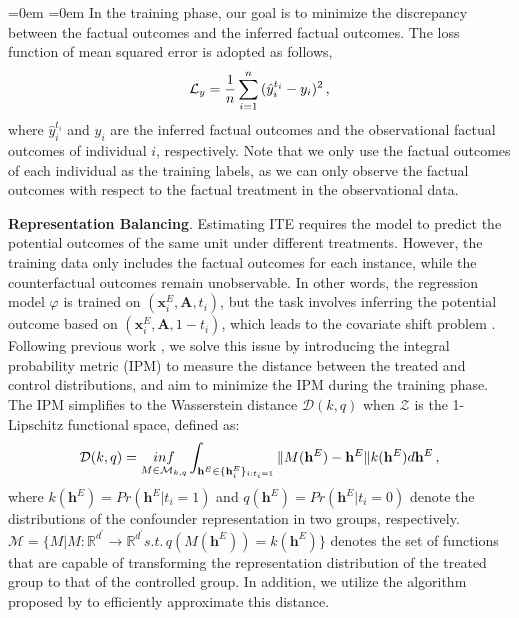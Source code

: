 \documentclass[twoside,leqno,twocolumn]{article}
\begin{document}
\begin{list}{}{\leftmargin=0em \itemindent=0em \topsep=0pt \parsep=0pt \itemsep=2pt}
In the training phase, our goal is to minimize the discrepancy between the factual outcomes and the inferred factual outcomes. The loss function of mean squared error is adopted as follows,
\begin{equation}
\label{eq14}
    \mathcal{L}_y = \frac{1}{n} \sum _{i=1}^{n} {(\hat{y}_i^{t_i} - y_i)^2} \,,
    \vspace{-0.5em}
\end{equation}
where $\hat{y}_i^{t_i}$ and ${y}_i$ are the inferred factual outcomes and the observational factual outcomes of individual $i$, respectively. 
Note that we only use the factual outcomes of each individual as the training labels, as we can only observe the factual outcomes with respect to the factual treatment in the observational data. 
\vspace{-0.2em}
\item \textbf{Representation Balancing}. Estimating ITE requires the model to predict the potential outcomes of the same unit under different treatments. However, the training data only includes the factual outcomes for each instance, while the counterfactual outcomes remain unobservable. 
In other words, the regression model $\varphi$ is trained on $(\mathbf{x}_i^E, \mathbf{A}, t_i)$, but the task involves inferring the potential outcome based on $(\mathbf{x}_i^E, \mathbf{A}, 1-t_i)$, which leads to the covariate shift problem \cite{johansson2016learning}. 
Following previous work \cite{shalit2017estimating}, we solve this issue by introducing the integral probability metric (IPM) to measure the distance between the treated and control distributions, and aim to minimize the IPM during the training phase. The IPM simplifies to the Wasserstein distance $\mathcal{D}(k,q)$ when $\mathcal{Z}$ is the 1-Lipschitz functional space, defined as:
\begin{equation}
\vspace{-0.2em}
\label{eq15}
\mathcal{D}(k,q)= \mathop{inf}\limits_{M \in \mathcal{M}_{k,q}}  \int_{
\mathbf{h}^E \in \{ \mathbf{h}^E_i \}_{i:t_i=1}
} \Vert M(\mathbf{h}^E)-\mathbf{h}^E \Vert k(\mathbf{h}^E)d\mathbf{h}^E \,,
\end{equation}
where $k(\mathbf{h}^E)=Pr(\mathbf{h}^E|t_i=1)$ and $q(\mathbf{h}^E)=Pr(\mathbf{h}^E|t_i=0)$ denote the distributions of the confounder representation in two groups, respectively.  
$\mathcal{M}=\{
M|M:\mathbb{R}^{d^\prime} \rightarrow \mathbb{R}^{d^\prime}   
s.t. \, q(M(\mathbf{h}^E)) = k(\mathbf{h}^E)
\}$
denotes the set of functions that are capable of transforming the representation distribution of the treated group to that of the controlled group. In addition, we utilize the algorithm proposed by \cite{cuturi2014fast} to efficiently approximate this distance.
\vspace{-0.8em}

\end{list}
\end{document}
